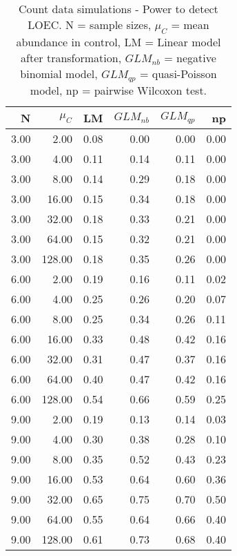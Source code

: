 \begin{table}[H]
\centering
\caption{Count data simulations - Power to detect LOEC. N = sample sizes, 
             $\mu_C$ = mean abundance in control, LM = Linear model after transformation, 
             $GLM_{nb}$ = negative binomial model, $GLM_{qp}$ = quasi-Poisson model, 
            np = pairwise Wilcoxon test.} 
\label{tab:pow_loec_c}
{\footnotesize
\begin{tabular}{rrrrrr}
  \hline
N & $\mu_C$ & LM & $GLM_{nb}$ & $GLM_{qp}$ & np \\ 
  \hline
3.00 & 2.00 & 0.08 & 0.00 & 0.00 & 0.00 \\ 
  3.00 & 4.00 & 0.11 & 0.14 & 0.11 & 0.00 \\ 
  3.00 & 8.00 & 0.14 & 0.29 & 0.18 & 0.00 \\ 
  3.00 & 16.00 & 0.15 & 0.34 & 0.18 & 0.00 \\ 
  3.00 & 32.00 & 0.18 & 0.33 & 0.21 & 0.00 \\ 
  3.00 & 64.00 & 0.15 & 0.32 & 0.21 & 0.00 \\ 
  3.00 & 128.00 & 0.18 & 0.35 & 0.26 & 0.00 \\ 
  6.00 & 2.00 & 0.19 & 0.16 & 0.11 & 0.02 \\ 
  6.00 & 4.00 & 0.25 & 0.26 & 0.20 & 0.07 \\ 
  6.00 & 8.00 & 0.25 & 0.34 & 0.26 & 0.11 \\ 
  6.00 & 16.00 & 0.33 & 0.48 & 0.42 & 0.16 \\ 
  6.00 & 32.00 & 0.31 & 0.47 & 0.37 & 0.16 \\ 
  6.00 & 64.00 & 0.40 & 0.47 & 0.42 & 0.16 \\ 
  6.00 & 128.00 & 0.54 & 0.66 & 0.59 & 0.25 \\ 
  9.00 & 2.00 & 0.19 & 0.13 & 0.14 & 0.03 \\ 
  9.00 & 4.00 & 0.30 & 0.38 & 0.28 & 0.10 \\ 
  9.00 & 8.00 & 0.35 & 0.52 & 0.43 & 0.23 \\ 
  9.00 & 16.00 & 0.53 & 0.64 & 0.60 & 0.36 \\ 
  9.00 & 32.00 & 0.65 & 0.75 & 0.70 & 0.50 \\ 
  9.00 & 64.00 & 0.55 & 0.64 & 0.66 & 0.40 \\ 
  9.00 & 128.00 & 0.61 & 0.73 & 0.68 & 0.40 \\ 
   \hline
\end{tabular}
}
\end{table}
